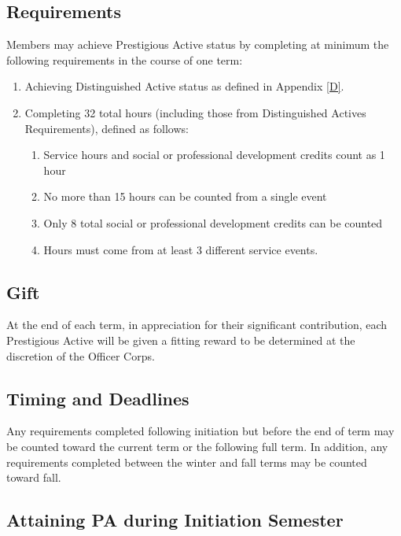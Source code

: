 \subsection{Requirements} \label{E.1}

Members may achieve Prestigious Active status by completing
at minimum the following requirements in the course of one term:
\begin{enumerate}
    \item {}
    Achieving Distinguished Active status as defined in Appendix \ref{D}.
    \item {}
    Completing 32 total hours (including those from Distinguished
Actives Requirements), defined as follows:
    \begin{enumerate}
        \item Service hours and social or professional development credits count as 1 hour
        \item No more than 15 hours can be counted from a single event
        \item Only 8 total social or professional development credits can be counted
        \item Hours must come from at least 3 different service events.
    \end{enumerate}
\end{enumerate}


\subsection{Gift} \label{E.2}

At the end of each term, in appreciation for their significant contribution,
each Prestigious Active will be given a fitting reward to be determined at the
discretion of the Officer Corps.

\subsection{Timing and Deadlines} \label{E.3}

Any requirements completed following initiation
but before the end of term may be counted toward the current term or the following
full term. In addition, any requirements completed between the winter and fall terms may
be counted toward fall.


\subsection{Attaining PA during Initiation Semester} \label{E.4}

